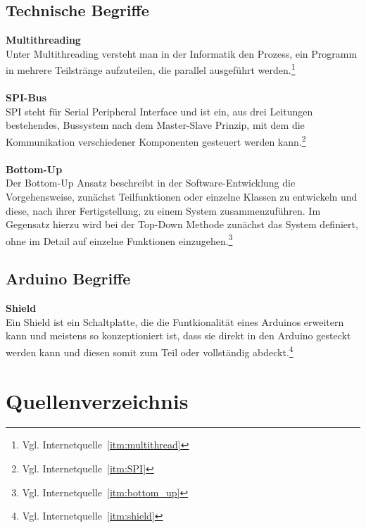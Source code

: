 \documentclass[a4paper, 11pt]{scrartcl}
\begin{document}
\subsection{Technische Begriffe}
\textbf{Multithreading\label{def:multithreading}}
\\
Unter Multithreading versteht man in der Informatik den Prozess, ein Programm in mehrere Teilstränge aufzuteilen, die parallel 
ausgeführt werden.\footnote{Vgl. Internetquelle~\ref{itm:multithread}}
\\
\\
\textbf{SPI-Bus\label{def:SPI}}
\\
SPI steht für Serial Peripheral Interface und ist ein, aus drei Leitungen bestehendes, Bussystem nach dem Master-Slave Prinzip, mit dem die Kommunikation
verschiedener Komponenten gesteuert werden kann.\footnote{Vgl. Internetquelle~\ref{itm:SPI}}
\\
\\
\textbf{Bottom-Up\label{def:bottom_up}}
\\
Der Bottom-Up Ansatz beschreibt in der Software-Entwicklung die Vorgehensweise, zunächst Teilfunktionen oder einzelne Klassen zu entwickeln und diese, nach ihrer
Fertigstellung, zu einem System zusammenzuführen. Im Gegensatz hierzu wird bei der Top-Down Methode zunächst das System definiert, ohne im Detail
auf einzelne Funktionen einzugehen.\footnote{Vgl. Internetquelle~\ref{itm:bottom_up}} 
\subsection{Arduino Begriffe}
\textbf{Shield\label{def:shield}}
\\
Ein Shield ist ein Schaltplatte, die die Funtkionalität eines Arduinos erweitern kann und meistens so konzeptioniert ist, dass sie direkt in den Arduino gesteckt werden kann und diesen somit
zum Teil oder vollständig abdeckt.\footnote{Vgl. Internetquelle~\ref{itm:shield}}
\newpage
\section{Quellenverzeichnis}
\end{document}
